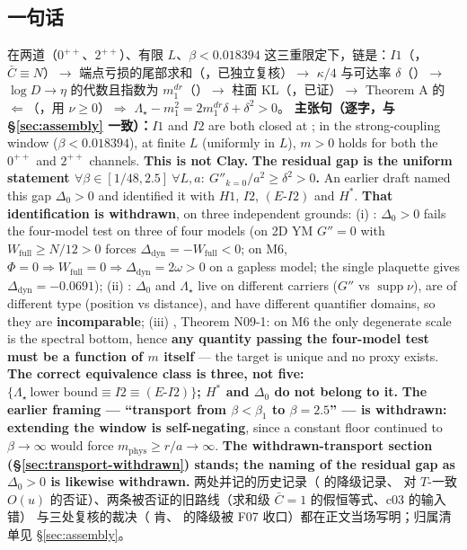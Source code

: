 \subsection{一句话}

在两道（$0^{++}$、$2^{++}$）、有限 $L$、$\beta<0.018394$ 这三重限定下，链是：$I1$（\LT，$\bar C\equiv N$）$\to$ 端点亏损的尾部求和（\LT，已独立复核）$\to$
$\kappa/4$ 与可达率 $\delta$（\LT）$\to$ $\log D\to\eta$ 的代数且指数为 $m_1^{dr}$（\LT）$\to$ 柱面 KL（\LT，已证）$\to$
Theorem A 的 $\Leftarrow$（\LT，用 $\nu\ge0$）$\Rightarrow$ $\Lambda_\star-m_1^2=2m_1^{dr}\delta+\delta^2>0$。
\textbf{主张句（逐字，与 \S\ref{sec:assembly} 一致）：}$I1$ and $I2$ are both closed at \code{[T]}; in the strong-coupling window ($\beta<0.018394$), at finite $L$ (uniformly in $L$), $m>0$ holds for both the $0^{++}$ and $2^{++}$ channels. \textbf{This is not Clay.} \textbf{The residual gap is the uniform statement $\forall\beta\in[1/48,2.5]\ \forall L,a:\ G''_{k=0}/a^2\ge\delta^2>0$.} An earlier draft named this gap $\Delta_0>0$ and identified it with $H1$, $I2$, $(E\text{-}I2)$ and $H^*$. \textbf{That identification is withdrawn}, on three independent grounds: (i) : $\Delta_0>0$ fails the four-model test on three of four models (on 2D YM $G''=0$ with $W_{\mathrm{full}}\ge N/12>0$ forces $\Delta_{\mathrm{dyn}}=-W_{\mathrm{full}}<0$; on M6, $\Phi=0\Rightarrow W_{\mathrm{full}}=0\Rightarrow\Delta_{\mathrm{dyn}}=2\omega>0$ on a gapless model; the single plaquette gives $\Delta_{\mathrm{dyn}}=-0.0691$); (ii) : $\Delta_0$ and $\Lambda_\star$ live on different carriers ($G''$ vs $\operatorname{supp}\nu$), are of different type (position vs distance), and have different quantifier domains, so they are \textbf{incomparable}; (iii) , Theorem N09-1: on M6 the only degenerate scale is the spectral bottom, hence \textbf{any quantity passing the four-model test must be a function of $m$ itself} --- the target is unique and no proxy exists. \textbf{The correct equivalence class is three, not five: $\{\Lambda_\star\ \text{lower bound}\equiv I2\equiv(E\text{-}I2)\}$; $H^*$ and $\Delta_0$ do not belong to it.} \textbf{The earlier framing --- ``transport from $\beta<\beta_1$ to $\beta=2.5$'' --- is withdrawn: extending the window is self-negating}, since a constant floor continued to $\beta\to\infty$ would force $m_{\mathrm{phys}}\ge r/a\to\infty$. \textbf{The withdrawn-transport section (\S\ref{sec:transport-withdrawn}) stands; the naming of the residual gap as $\Delta_0>0$ is likewise withdrawn.}
两处并记的历史记录（ 的降级记录、 对 $T$-一致 $O(u)$ 的否证）、两条被否证的旧路线（求和级 $\bar C=1$ 的假恒等式、c03 的输入错）
与三处复核的裁决（ 肯、 的降级被 F07 收口）都在正文当场写明；归属清单见 \S\ref{sec:assembly}。
